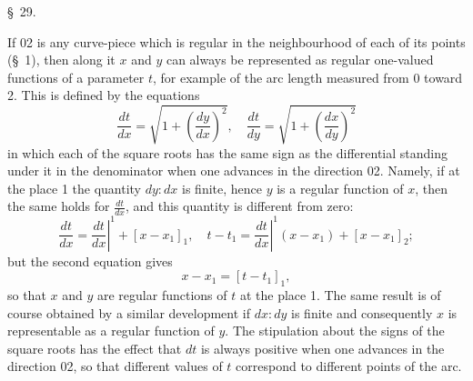 \documentclass[11pt,a4paper,leqno]{article}
\begin{document}
\begin{center}{\large \S~29.}\end{center}

If 02 is any curve-piece which is regular in the neighbourhood of each of its points (\S~1), then along it $x$ and $y$ can always be represented as regular one-valued functions of a parameter $t$, for example of the arc length measured from 0 toward 2. This is defined by the equations
\[
\frac{dt}{dx}=\sqrt{1+\left(\frac{dy}{dx}\right)^2},
\quad
\frac{dt}{dy}=\sqrt{1+\left(\frac{dx}{dy}\right)^2}
\]
in which each of the square roots has the same sign as the differential standing under it in the denominator when one advances in the direction 02. Namely, if at the place 1 the quantity $dy:dx$ is finite, hence $y$ is a regular function of $x$, then the same holds for $\frac{dt}{dx}$, and this quantity is different from zero:
\[
\frac{dt}{dx}=\left.\frac{dt}{dx}\right|^1+[x-x_1]_1,
\quad
t-t_1=\left.\frac{dt}{dx}\right|^1(x-x_1)+[x-x_1]_2;
\]
but the second equation gives
\[
x-x_1=[t-t_1]_1,
\]
so that $x$ and $y$ are regular functions of $t$ at the place 1. The same result is of course obtained by a similar development if $dx:dy$ is finite and consequently $x$ is representable as a regular function of $y$. The stipulation about the signs of the square roots has the effect that $dt$ is always positive when one advances in the direction 02, so that different values of $t$ correspond to different points of the arc.
\end{document}
